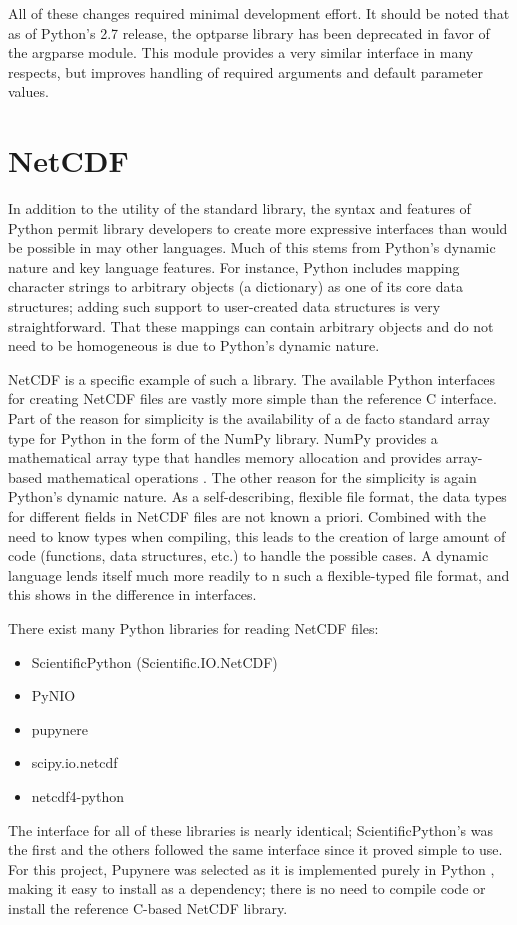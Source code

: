 \documentclass[twocolumn]{article}
\begin{document}
All of these changes required minimal development effort. It should be noted
that as of Python's 2.7 release, the optparse library has been deprecated in
favor of the argparse module. This module provides a very similar interface
in many respects, but improves handling of required arguments and default
parameter values. \cite{optparse}

\section{NetCDF}
In addition to the utility of the standard library, the syntax and features of Python
permit library developers to create more expressive interfaces than would be possible
in may other languages. Much of this stems from Python's dynamic nature and
key language features. For instance, Python includes mapping character strings to
arbitrary objects (a dictionary) as one of its core data structures; adding
such support to user-created data structures is very straightforward. That these
mappings can contain arbitrary objects and do not need to be homogeneous is due
to Python's dynamic nature.

NetCDF is a specific example of such a library. The available Python interfaces
for creating NetCDF files are vastly more simple than the reference C interface.
Part of the reason for simplicity is the availability of a de facto standard
array type for Python in the form of the NumPy library. NumPy provides a
mathematical array type that handles memory allocation and provides array-based
mathematical operations \cite{numpy}. The other reason for the simplicity is
again Python's dynamic nature. As a self-describing, flexible file format, the
data types for different fields in NetCDF files are not known a priori. Combined
with the need to know types when compiling, this leads to the creation of large
amount of code (functions, data structures, etc.) to handle the possible cases.
A dynamic language lends itself much more readily to n such a flexible-typed file
format, and this shows in the difference in interfaces.

There exist many Python libraries for reading NetCDF files:
\begin{itemize}
  \item ScientificPython (Scientific.IO.NetCDF)
  \item PyNIO
  \item pupynere
  \item scipy.io.netcdf
  \item netcdf4-python
\end{itemize}
The interface for all of these libraries is nearly identical; ScientificPython's
was the first and the others followed the same interface since it proved
simple to use. For this project, Pupynere was selected as it is implemented
purely in Python \cite{pupynere}, making it easy to install as a dependency; 
there is no need to compile code or install the reference C-based NetCDF library.
\end{document}
